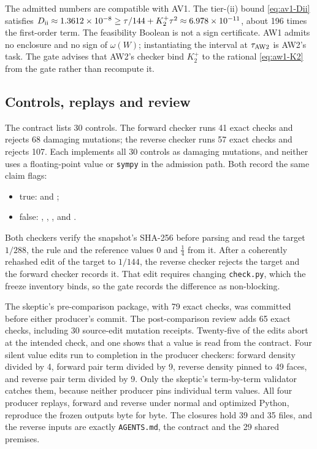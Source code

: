 The admitted numbers are compatible with AV1. The tier-(ii) bound
\eqref{eq:av1-Dii} satisfies
$D_{\rm ii}\approx1.3612\times10^{-8}\ge\tau/144+K_2^+\tau^2\approx6.978\times10^{-11}$,
about 196 times the first-order term. The feasibility Boolean is not a sign
certificate. AW1 admits no enclosure and no sign of $\omega(W)$; instantiating
the interval at $\tau_{\rm AW2}$ is AW2's task. The gate advises that AW2's
checker bind $K_2^+$ to the rational \eqref{eq:aw1-K2} from the gate rather
than recompute it.

\subsection{Controls, replays and review}
\label{sec:aw1-evidence}
The contract lists 30 controls. The forward checker runs 41 exact checks and
rejects 68 damaging mutations; the reverse checker runs 57 exact checks and
rejects 107. Each implements all 30 controls as damaging mutations, and
neither uses a floating-point value or \texttt{sympy} in the admission path.
Both record the same claim flags:
\begin{itemize}\raggedright
\item true:  and ;
\item false: , ,
,  and
.
\end{itemize}
Both checkers verify the
snapshot's SHA-256 before parsing and read the target $1/288$, the rule and
the reference values $0$ and $\tfrac14$ from it. After a coherently rehashed
edit of the target to $1/144$, the reverse checker rejects the target and the
forward checker records it. That edit requires changing \texttt{check.py},
which the freeze inventory binds, so the gate records the difference as
non-blocking.

The skeptic's pre-comparison package, with 79 exact checks, was committed
before either producer's commit. The post-comparison review adds 65 exact
checks, including 30 source-edit mutation receipts. Twenty-five of the edits
abort at the intended check, and one shows that a value is read from the
contract. Four silent value edits run to completion in the producer
checkers: forward density divided by 4, forward pair term divided by
9, reverse density pinned to 49 faces, and reverse pair term divided by 9.
Only the skeptic's term-by-term validator catches them, because neither
producer pins individual term values. All four producer replays, forward and
reverse under normal and optimized Python, reproduce the frozen outputs byte
for byte. The closures hold 39 and 35 files, and the reverse inputs are
exactly \texttt{AGENTS.md}, the contract and the 29 shared premises.

